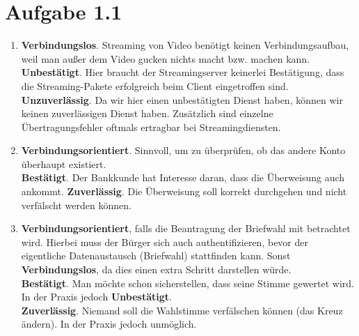 \documentclass[12pt, a4paper]{article}
\begin{document}
\begin{center}\end{center}



\section*{Aufgabe 1.1}
\begin{enumerate}[label=\roman*)]
	\item	\textbf{Verbindungslos}. Streaming von Video benötigt keinen Verbindungsaufbau, weil man außer dem Video gucken nichts macht bzw. machen kann.\\
			\textbf{Unbestätigt}. Hier braucht der Streamingserver keinerlei Bestätigung, dass die Streaming-Pakete erfolgreich beim Client eingetroffen sind.\\
			\textbf{Unzuverlässig}. Da wir hier einen unbestätigten Dienst haben, können wir keinen zuverlässigen Dienst haben. Zusätzlich sind einzelne Übertragungsfehler oftmals ertragbar bei Streamingdiensten.
	
	\item	\textbf{Verbindungsorientiert}. Sinnvoll, um zu überprüfen, ob das andere Konto überhaupt existiert.\\
			\textbf{Bestätigt}. Der Bankkunde hat Interesse daran, dass die Überweisung auch ankommt.
			\textbf{Zuverlässig}. Die Überweisung soll korrekt durchgehen und nicht verfälscht werden können.
	
	\item	\textbf{Verbindungsorientiert}, falls die Beantragung der Briefwahl mit betrachtet wird. Hierbei muss der Bürger sich auch authentifizieren, bevor der eigentliche Datenaustausch (Briefwahl) stattfinden kann. Sonst \textbf{Verbindungslos}, da dies einen extra Schritt darstellen würde.\\
			\textbf{Bestätigt}. Man möchte schon sicherstellen, dass seine Stimme gewertet wird. In der Praxis jedoch \textbf{Unbestätigt}.\\
			\textbf{Zuverlässig}. Niemand soll die Wahlstimme verfälschen können (das Kreuz ändern). In der Praxis jedoch unmöglich.
\end{enumerate}
\end{document}
